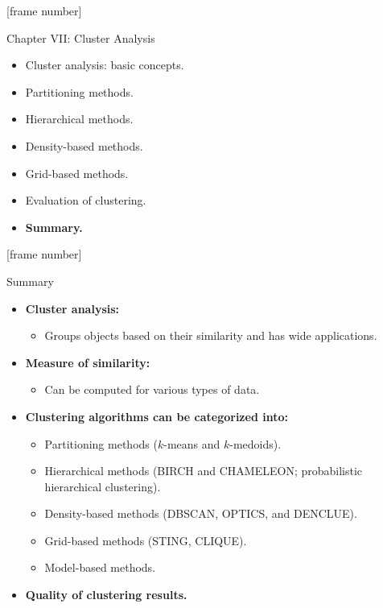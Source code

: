 \documentclass[aspectratio=169,t,xcolor=dvipsnames]{beamer}
\begin{document}
  {
    [frame number]
    \begin{frame}{Chapter VII: Cluster Analysis}
        \begin{itemize}
            \item Cluster analysis: basic concepts.
            \item Partitioning methods.
            \item Hierarchical methods.
            \item Density-based methods.
            \item Grid-based methods.
            \item Evaluation of clustering.
            \item \textbf{Summary.}
        \end{itemize}
    \end{frame}
  }

  {
    [frame number]
    \begin{frame}{Summary}
      \begin{itemize}
        \item \textbf{Cluster analysis:}
        \begin{itemize}
          \item Groups objects based on their similarity and has wide applications.
        \end{itemize}
        \item \textbf{Measure of similarity:}
        \begin{itemize}
          \item Can be computed for various types of data.
        \end{itemize}
        \item \textbf{Clustering algorithms can be categorized into:}
        \begin{itemize}
          \item Partitioning methods ($k$-means and $k$-medoids).
          \item Hierarchical methods (BIRCH and CHAMELEON; probabilistic hierarchical clustering).
          \item Density-based methods (DBSCAN, OPTICS, and DENCLUE).
          \item Grid-based methods (STING, CLIQUE).
          \item Model-based methods.
        \end{itemize}
        \item \textbf{Quality of clustering results.}
      \end{itemize}
    \end{frame}
  }
\end{document}
